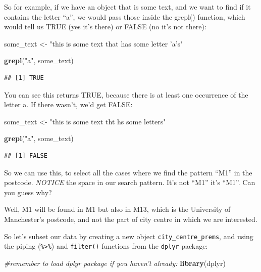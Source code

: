 \documentclass[]{book}
\newenvironment{Shaded}{\begin{snugshade}}{\end{snugshade}}
\newcommand{\CommentTok}[1]{\textcolor[rgb]{0.56,0.35,0.01}{\textit{#1}}}
\newcommand{\KeywordTok}[1]{\textcolor[rgb]{0.13,0.29,0.53}{\textbf{#1}}}
\newcommand{\NormalTok}[1]{#1}
\newcommand{\StringTok}[1]{\textcolor[rgb]{0.31,0.60,0.02}{#1}}
\begin{document}
So for example, if we have an object that is some text, and we want to find if it contains the letter ``a'', we would pass those inside the grepl() function, which would tell us TRUE (yes it's there) or FALSE (no it's not there):

\begin{Shaded}
\begin{Highlighting}[]
\NormalTok{some_text <-}\StringTok{ "this is some text that has some letter 'a's"}

\KeywordTok{grepl}\NormalTok{(}\StringTok{"a"}\NormalTok{, some_text)}
\end{Highlighting}
\end{Shaded}

\begin{verbatim}
## [1] TRUE
\end{verbatim}

You can see this returns TRUE, because there is at least one occurrence of the letter a. If there wasn't, we'd get FALSE:

\begin{Shaded}
\begin{Highlighting}[]
\NormalTok{some_text <-}\StringTok{ "this is some text tht hs some letters"}

\KeywordTok{grepl}\NormalTok{(}\StringTok{"a"}\NormalTok{, some_text)}
\end{Highlighting}
\end{Shaded}

\begin{verbatim}
## [1] FALSE
\end{verbatim}

So we can use this, to select all the cases where we find the pattern ``M1'' in the postcode. \emph{NOTICE} the space in our search pattern. It's not ``M1'' it's ``M1''. Can you guess why?

Well, M1 will be found in M1 but also in M13, which is the University of Manchester's postcode, and not the part of city centre in which we are interested.

So let's subset our data by creating a new object \texttt{city\_centre\_prems}, and using the piping (\texttt{\%\textgreater{}\%}) and \texttt{filter()} functions from the \texttt{dplyr} package:

\begin{Shaded}
\begin{Highlighting}[]
\CommentTok{#remember to load dplyr package if you haven't already: }
\KeywordTok{library}\NormalTok{(dplyr)}
\end{Highlighting}
\end{Shaded}
\end{document}
